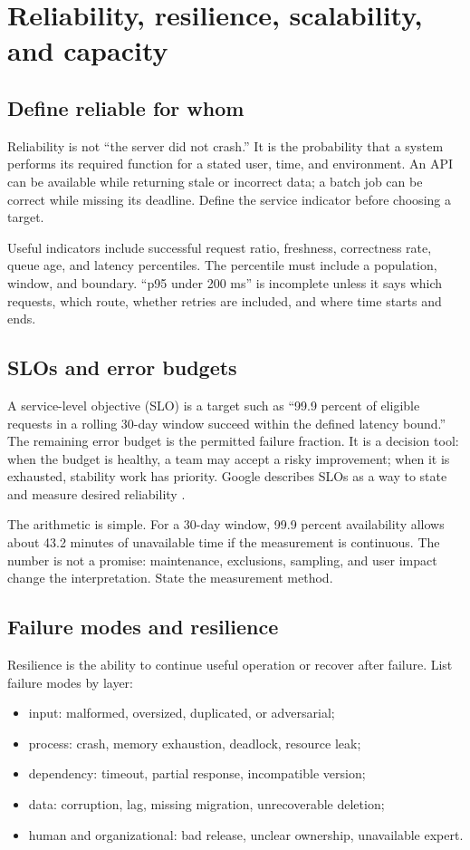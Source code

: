 \chapter{Reliability, resilience, scalability, and capacity}

\section{Define reliable for whom}
Reliability is not “the server did not crash.” It is the probability that a
system performs its required function for a stated user, time, and environment.
An API can be available while returning stale or incorrect data; a batch job can
be correct while missing its deadline. Define the service indicator before
choosing a target.

Useful indicators include successful request ratio, freshness, correctness rate,
queue age, and latency percentiles. The percentile must include a population,
window, and boundary. “p95 under 200 ms” is incomplete unless it says which
requests, which route, whether retries are included, and where time starts and
ends.

\section{SLOs and error budgets}
A service-level objective (SLO) is a target such as “99.9 percent of eligible
requests in a rolling 30-day window succeed within the defined latency bound.”
The remaining error budget is the permitted failure fraction. It is a decision
tool: when the budget is healthy, a team may accept a risky improvement; when it
is exhausted, stability work has priority. Google describes SLOs as a way to
state and measure desired reliability \cite{google2016sre}.

The arithmetic is simple. For a 30-day window, 99.9 percent availability allows
about 43.2 minutes of unavailable time if the measurement is continuous. The
number is not a promise: maintenance, exclusions, sampling, and user impact
change the interpretation. State the measurement method.

\section{Failure modes and resilience}
Resilience is the ability to continue useful operation or recover after failure.
List failure modes by layer:

\begin{itemize}
  \item input: malformed, oversized, duplicated, or adversarial;
  \item process: crash, memory exhaustion, deadlock, resource leak;
  \item dependency: timeout, partial response, incompatible version;
  \item data: corruption, lag, missing migration, unrecoverable deletion;
  \item human and organizational: bad release, unclear ownership, unavailable expert.
\end{itemize}

